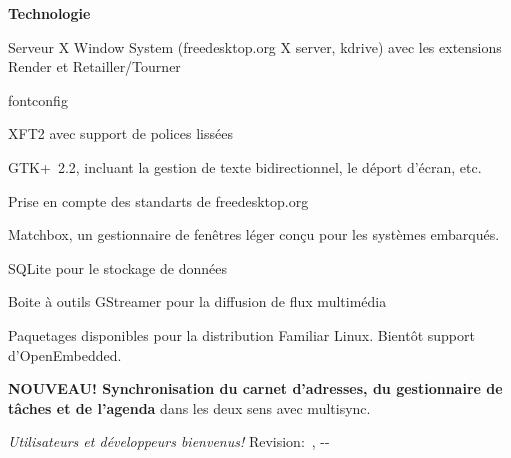 {\smallskip
\textbf{Technologie}
\begin{compactitem}
   \item Serveur X Window System{\texttrademark}{} (freedesktop.org X
     server, kdrive) avec les extensions Render et
     Retailler/Tourner
   \item fontconfig
   \item XFT2 avec support de polices liss{\'e}es
   \item GTK+~2.2, incluant la gestion de texte bidirectionnel, le d{\'e}port d'{\'e}cran, etc.
   \item Prise en compte des standarts de freedesktop.org
   \item Matchbox, un gestionnaire de fen{\^e}tres l{\'e}ger con\c{c}u pour les syst{\`e}mes embarqu{\'e}s.
   \item SQLite pour le stockage de donn{\'e}es
   \item Boite {\`a} outils GStreamer pour la diffusion de flux multim{\'e}dia
   \item Paquetages disponibles pour la distribution Familiar Linux. Bient{\^o}t support d'OpenEmbedded.
   \item \textbf{NOUVEAU! Synchronisation du carnet d'adresses, du gestionnaire de t{\^a}ches et de l'agenda} dans
   	les deux sens avec multisync.
\end{compactitem}

\smallskip
\textit{{\textexclamdown}Utilisateurs et d{\'e}veloppeurs bienvenus!}%
\hfill\tiny{Revision:~\rcsInfoRevision, \rcsInfoYear-\rcsInfoMonth-\rcsInfoDay}
}

